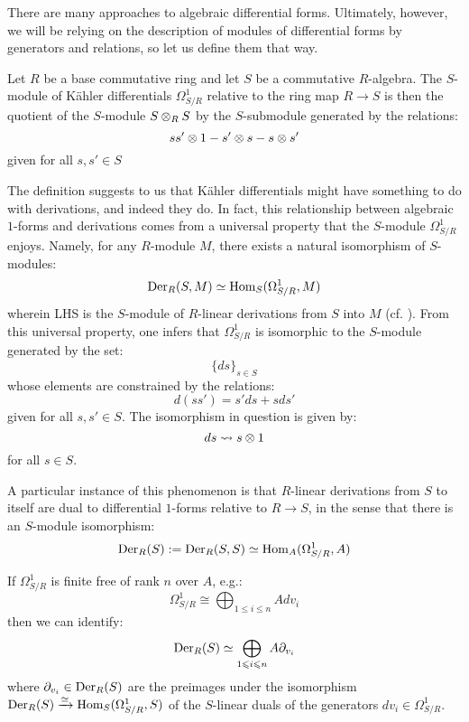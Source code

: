         There are many approaches to algebraic differential forms. Ultimately, however, we will be relying on the description of modules of differential forms by generators and relations, so let us define them that way.
        \begin{definition} \label{def: kahler_differentials}
            Let $R$ be a base commutative ring and let $S$ be a commutative $R$-algebra. The $S$-module of K\"ahler differentials $\Omega^1_{S/R}$ relative to the ring map $R \to S$ is then the quotient of the $S$-module $S \tensor_R S$ by the $S$-submodule generated by the relations:
                $$ss' \tensor 1 - s' \tensor s - s \tensor s'$$
            given for all $s, s' \in S$
        \end{definition}
        \begin{remark} \label{remark: differentials_and_derivations}
            The definition suggests to us that K\"ahler differentials might have something to do with derivations, and indeed they do. In fact, this relationship between algebraic $1$-forms and derivations comes from a universal property that the $S$-module $\Omega^1_{S/R}$ enjoys. Namely, for any $R$-module $M$, there exists a natural isomorphism of $S$-modules:
                $$\mathrm{Der}_R(S, M) \simeq \mathrm{Hom}_S(\Omega^1_{S/R}, M)$$
            wherein LHS is the $S$-module of $R$-linear derivations from $S$ into $M$ (cf. \cite[\href{https://stacks.math.columbia.edu/tag/00RO}{Tag 00RO}]{stacks}). From this universal property, one infers that $\Omega^1_{S/R}$ is isomorphic to the $S$-module generated by the set:
                $$\{ds\}_{s \in S}$$
            whose elements are constrained by the relations:
                $$d(ss') = s' ds + s ds'$$
            given for all $s, s' \in S$. The isomorphism in question is given by:
                $$ds \mapsto s \tensor 1$$
            for all $s \in S$.
            
            A particular instance of this phenomenon is that $R$-linear derivations from $S$ to itself are dual to differential $1$-forms relative to $R \to S$, in the sense that there is an $S$-module isomorphism:
                $$\mathrm{Der}_R(S) := \mathrm{Der}_R(S, S) \simeq \mathrm{Hom}_A(\Omega^1_{S/R}, A)$$
        \end{remark}
        \begin{remark} \label{remark: free_modules_of_1_forms}
            If $\Omega^1_{S/R}$ is finite free of rank $n$ over $A$, e.g.:
                $$\Omega^1_{S/R} \cong \bigoplus_{1 \leq i \leq n} A dv_i$$
            then we can identify:
                $$\mathrm{Der}_R(S) \simeq \bigoplus_{1 \leqslant i \leqslant n} A \partial_{v_i}$$
            where $\partial_{v_i} \in \mathrm{Der}_R(S)$ are the preimages under the isomorphism $\mathrm{Der}_R(S) \xrightarrow[]{\simeq} \mathrm{Hom}_S(\Omega^1_{S/R}, S)$ of the $S$-linear duals of the generators $dv_i \in \Omega^1_{S/R}$. 
        \end{remark}
        
